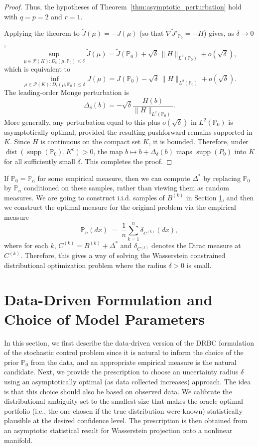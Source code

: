 \documentclass[11pt]{article}
\theoremstyle{definition}
\begin{document}
\begin{proof}
Thus, the hypotheses of Theorem~\ref{thm:asymptotic_perturbation} hold with $q=p=2$ and $r=1$.

Applying the theorem to $\widetilde J(\mu)=-J(\mu)$ (so that $\nabla\widetilde J'_{\mathbb{P}_0}=-H$)
gives, as $\delta\to0$,
\[
\sup_{{\mu \in \mathcal{P}(K)}: D_c(\mu,\mathbb{P}_0)\le\delta}\widetilde J(\mu)
= \widetilde J(\mathbb{P}_0) + \sqrt{\delta}\,\|H\|_{L^2(\mathbb{P}_0)} + o(\sqrt{\delta}),
\]
which is equivalent to
\[
\inf_{{\mu \in \mathcal{P}(K)}: D_c(\mu,\mathbb{P}_0)\le\delta}J(\mu)
= J(\mathbb{P}_0) - \sqrt{\delta}\,\|H\|_{L^2(\mathbb{P}_0)} + o(\sqrt{\delta}).
\]
{
The leading-order Monge perturbation is
\[
\Delta_\delta(b)
=
-\sqrt{\delta}\frac{H(b)}{\|H\|_{L^2(\mathbb P_0)}}.
\]
More generally, any perturbation equal to this plus \(o(\sqrt\delta)\) in \(L^2(\mathbb P_0)\)
is asymptotically optimal, provided the resulting pushforward remains supported in \(K\). 
Since $H$ is continuous on the compact set $K$, it is bounded.
Therefore, under
$\operatorname{dist}(\operatorname{supp}(\mathbb P_0),K^c)>0$,
the map $b\mapsto b+\Delta_\delta(b)$ maps
$\operatorname{supp}(P_0)$ into $K$ for all sufficiently small
$\delta$.} This completes the proof. 
\end{proof}


If $\mathbb{P}_0 = \mathbb{P}_n$ for some empirical measure, then we can compute $\Delta^*$ by replacing $\mathbb{P}_0$ by $\mathbb{P}_n$ conditioned on these samples, rather than viewing them as random measures. We are going to construct i.i.d. samples of $B^{(k)}$ in Section \ref{projection}, and then we construct the optimal measure for the original problem via the %
empirical measure 
\[
\mathbb P_n(dx) \;=\; \frac{1}{n}\sum_{k=1}^n \delta_{C^{(k)}}(dx),
\]where for each $k$, $C^{(k)} = B^{(k)} + \Delta^*$ { and $\delta_{C^{(k)}}$ denotes the Dirac measure at $ C^{(k)}$}. Therefore,  this gives a way of solving the Wasserstein constrained distributional optimization problem where {the radius} $\delta > 0$ is small.



\section{Data-Driven Formulation and Choice of Model Parameters}\label{projection}
In this section, we first describe the data-driven version of the DRBC formulation of the stochastic control problem since it is natural to inform the choice of the prior $\mathbb{P}_0$ from the data, and an appropriate empirical measure is the natural candidate. Next, we provide the prescription to choose an uncertainty radius $\delta$ using an asymptotically optimal (as data collected increases) approach. The idea is that this choice should also be based on observed data. We calibrate the distributional ambiguity set to the smallest size that makes the oracle-optimal portfolio (i.e., the one chosen if the true distribution were known) statistically plausible at the desired confidence level. The prescription is then obtained from an asymptotic statistical result for Wasserstein projection onto a nonlinear manifold.
\end{document}
